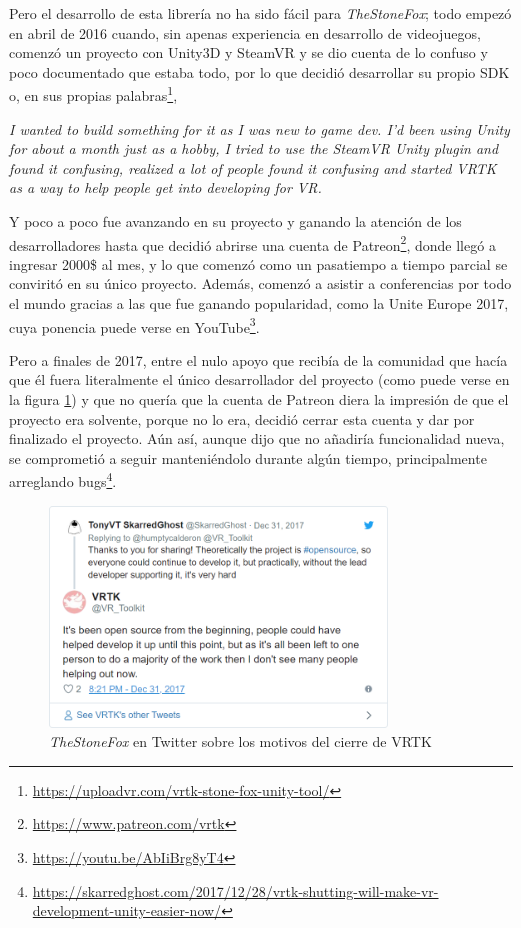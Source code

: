 Pero el desarrollo de esta librería no ha sido fácil para \textit{TheStoneFox}; todo empezó en abril de 2016 cuando, sin apenas experiencia en desarrollo de videojuegos, comenzó un proyecto con Unity3D y SteamVR y se dio cuenta de lo confuso y poco documentado que estaba todo, por lo que decidió desarrollar su propio \acs{SDK} o, en sus propias palabras\footnote{\url{https://uploadvr.com/vrtk-stone-fox-unity-tool/}},

\begin{displayquote}
\textit{I wanted to build something for it as I was new to game dev. I’d been using Unity for about a month just as a hobby, I tried to use the SteamVR Unity plugin and found it confusing, realized a lot of people found it confusing and started VRTK as a way to help people get into developing for VR.}
\end{displayquote}

Y poco a poco fue avanzando en su proyecto y ganando la atención de los desarrolladores hasta que decidió abrirse una cuenta de Patreon\footnote{\url{https://www.patreon.com/vrtk}}, donde llegó a ingresar 2000\$ al mes, y lo que comenzó como un pasatiempo a tiempo parcial se conviritó en su único proyecto. Además, comenzó a asistir a conferencias por todo el mundo gracias a las que fue ganando popularidad, como la Unite Europe 2017, cuya ponencia puede verse en YouTube\footnote{\url{https://youtu.be/AbIiBrg8yT4}}.

Pero a finales de 2017, entre el nulo apoyo que recibía de la comunidad que hacía que él fuera literalmente el único desarrollador del proyecto (como puede verse en la figura \ref{fig:stonefox-twitter}) y que no quería que la cuenta de Patreon diera la impresión de que el proyecto era solvente, porque no lo era, decidió cerrar esta cuenta y dar por finalizado el proyecto. Aún así, aunque dijo que no añadiría funcionalidad nueva, se comprometió a seguir manteniéndolo durante algún tiempo, principalmente arreglando bugs\footnote{\url{https://skarredghost.com/2017/12/28/vrtk-shutting-will-make-vr-development-unity-easier-now/}}.

\begin{figure}[!h]
\begin{center}
\includegraphics[width=0.8\textwidth]{imagenes/2/stonefox-twitter.png}
\caption{\textit{TheStoneFox} en Twitter sobre los motivos del cierre de \acs{VRTK}}
\label{fig:stonefox-twitter}
\end{center}
\end{figure}

